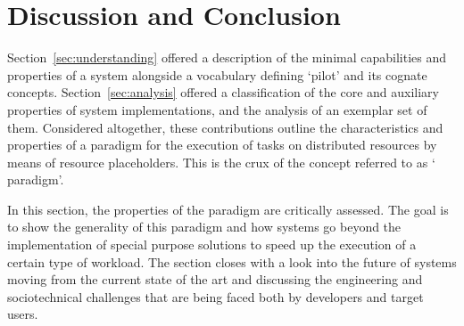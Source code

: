 \documentclass{sig-alternate}
\begin{document}


%
\section{Discussion and Conclusion}
\label{sec:discussion}




Section~\ref{sec:understanding} offered a description of the minimal
capabilities and properties of a \pilot system alongside a vocabulary defining
`pilot' and its cognate concepts. Section~\ref{sec:analysis} offered a
classification of the core and auxiliary properties of \pilot system
implementations, and the analysis of an exemplar set of them. Considered
altogether, these contributions outline the characteristics and properties of a
paradigm for the execution of tasks on distributed resources by means of
resource placeholders. This is the crux of the concept referred to as `\pilot
paradigm'.

In this section, the properties of the \pilot paradigm are critically assessed.
The goal is to show the generality of this paradigm and how \pilot systems go
beyond the implementation of special purpose solutions to speed up the execution
of a certain type of workload. The section closes with a look into the future of
\pilot systems moving from the current state of the art and discussing the
engineering and sociotechnical challenges that are being faced both by
developers and target users.
\end{document}

